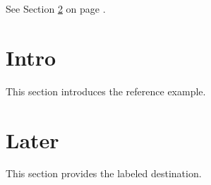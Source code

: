 \documentclass{article}
\begin{document}
See Section \ref{sec:later} on page \pageref{sec:later}.

\section{Intro}
This section introduces the reference example.

\section{Later}\label{sec:later}
This section provides the labeled destination.
\end{document}
